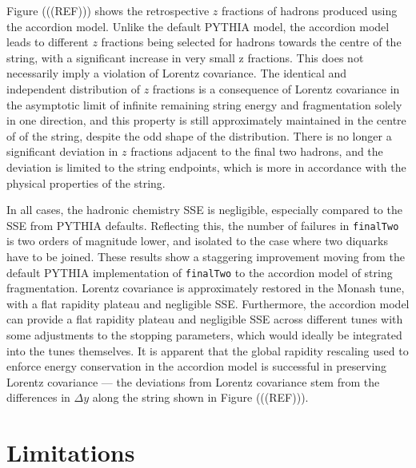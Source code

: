 \documentclass[12pt,a4paper]{report}
\begin{document}
Figure (((REF))) shows the retrospective $z$ fractions of hadrons produced using the accordion model. Unlike the default PYTHIA model, the accordion model leads to different $z$ fractions being selected for hadrons towards the centre of the string, with a significant increase in very small z fractions. This does not necessarily imply a violation of Lorentz covariance. The identical and independent distribution of $z$ fractions is a consequence of Lorentz covariance in the asymptotic limit of infinite remaining string energy and fragmentation solely in one direction, and this property is still approximately maintained in the centre of of the string, despite the odd shape of the distribution. There is no longer a significant deviation in $z$ fractions adjacent to the final two hadrons, and the deviation is limited to the string endpoints, which is more in accordance with the physical properties of the string.

In all cases, the hadronic chemistry SSE is negligible, especially compared to the SSE from PYTHIA defaults. Reflecting this, the number of failures in \texttt{finalTwo} is two orders of magnitude lower, and isolated to the case where two diquarks have to be joined. These results show a staggering improvement moving from the default PYTHIA implementation of \texttt{finalTwo} to the accordion model of string fragmentation. Lorentz covariance is approximately restored in the Monash tune, with a flat rapidity plateau and negligible SSE. Furthermore, the accordion model can provide a flat rapidity plateau and negligible SSE across different tunes with some adjustments to the stopping parameters, which would ideally be integrated into the tunes themselves. It is apparent that the global rapidity rescaling used to enforce energy conservation in the accordion model is successful in preserving Lorentz covariance --- the deviations from Lorentz covariance stem from the differences in $\Delta y$ along the string shown in Figure (((REF))).

\section{Limitations}
\label{chap:accordion-limitations}
\end{document}
